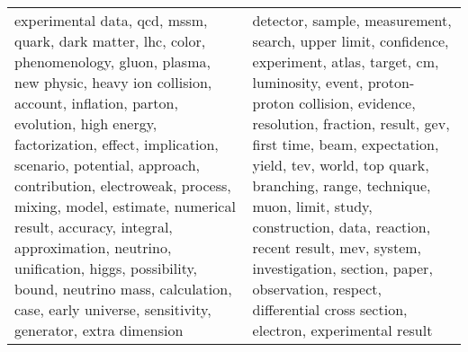 \begin{longtable}{p{7cm}|p{7cm}}
\bottomrule
\endlastfoot
experimental data, qcd, mssm, quark, dark matter, lhc, color, phenomenology, gluon, plasma, new physic, heavy ion collision, account, inflation, parton, evolution, high energy, factorization, effect, implication, scenario, potential, approach, contribution, electroweak, process, mixing, model, estimate, numerical result, accuracy, integral, approximation, neutrino, unification, higgs, possibility, bound, neutrino mass, calculation, case, early universe, sensitivity, generator, extra dimension & detector, sample, measurement, search, upper limit, confidence, experiment, atlas, target, cm, luminosity, event, proton-proton collision, evidence, resolution, fraction, result, gev, first time, beam, expectation, yield, tev, world, top quark, branching, range, technique, muon, limit, study, construction, data, reaction, recent result, mev, system, investigation, section, paper, observation, respect, differential cross section, electron, experimental result \\
\end{longtable}
